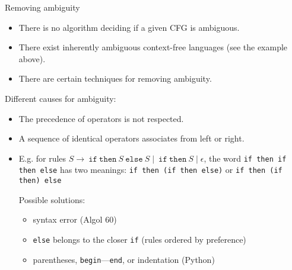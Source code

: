 \documentclass[handout]{beamer}
\begin{document}
\begin{frame}{Removing ambiguity}

	\begin{itemize}
		\item There is no algorithm deciding if a given CFG is ambiguous.
		\item There exist inherently ambiguous context-free languages (see the example above).
		\item There are certain techniques for removing ambiguity.
	\end{itemize}

	Different causes for ambiguity:
	\begin{itemize}
		\item The precedence of operators is not respected.
		\item A sequence of identical operators associates from left or right.
		\item E.g. for rules $S\rightarrow\ \mathtt{if}\ \mathtt{then}\ S\ \mathtt{else}\ S\mid\ \mathtt{if}\ \mathtt{then}\ S\mid\epsilon$, the word \alert{\texttt{if then if then else}} has two meanings:
		\alert{\texttt{if then (if then else)}} or \alert{\texttt{if then (if then) else}}

		\medskip
		Possible solutions:
		\begin{itemize}
			\item syntax error (Algol 60)
			\item \texttt{else} belongs to the closer \texttt{if} (rules ordered by preference)
			\item parentheses, \texttt{begin}---\texttt{end}, or indentation (Python)
		\end{itemize}
	\end{itemize}

\end{frame}
\end{document}

